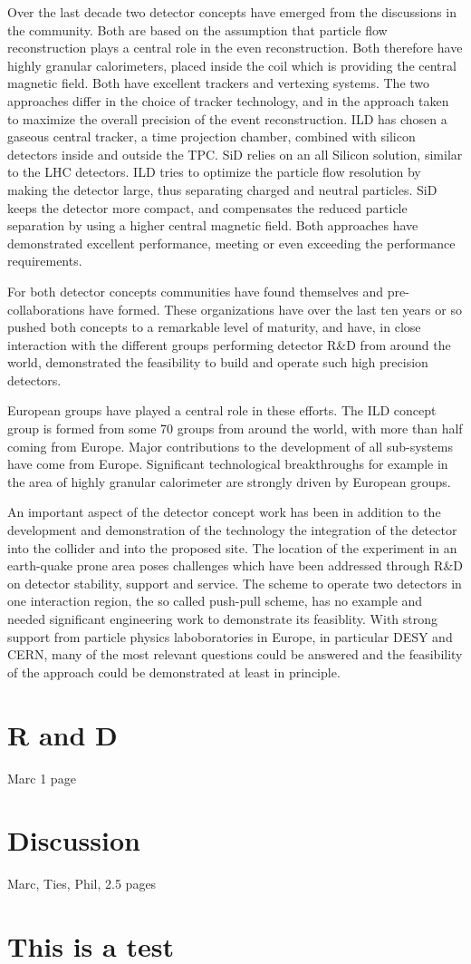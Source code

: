 \documentclass[%
 reprint,
 amsmath,amssymb,
 aps,
]{revtex4-1}
\begin{document}
Over the last decade two detector concepts have emerged from the discussions in the community. Both are based on the assumption that particle flow reconstruction plays a central role in the even reconstruction. Both therefore have highly granular calorimeters, placed inside the coil which is providing the central magnetic field. Both have excellent trackers and vertexing systems. The two approaches differ in the choice of tracker technology, and in the approach taken to maximize the overall precision of the event reconstruction. ILD has chosen a gaseous central tracker, a time projection chamber, combined with silicon detectors inside and outside the TPC. SiD relies on an all Silicon solution, similar to the LHC detectors. ILD tries to optimize the particle flow resolution by making the detector large, thus separating charged and neutral particles. SiD keeps the detector more compact, and compensates the reduced particle separation by using a higher central magnetic field. Both approaches have demonstrated excellent performance, meeting or even exceeding the performance requirements. 

For both detector concepts communities have found themselves and pre-collaborations have formed. These organizations have over the last ten years or so pushed both concepts to a remarkable level of maturity, and have, in close interaction with the different groups performing detector R\&D from around the world, demonstrated the feasibility to build and operate such high precision detectors. 

European groups have played a central role in these efforts. The ILD concept group is formed from some 70 groups from around the world, with more than half coming from Europe. Major contributions to the development of all sub-systems have come from Europe. Significant technological breakthroughs for example in the area of highly granular calorimeter are strongly driven by European groups. 

An important aspect of the detector concept work has been in addition to the development and demonstration of the technology the integration of the detector into the collider and into the proposed site. The location of the experiment in an earth-quake prone area poses challenges which have been addressed through R\&D on detector stability, support and service. The scheme to operate two detectors in one interaction region, the so called push-pull scheme, has no example and needed significant engineering work to demonstrate its feasiblity. With strong support from particle physics laboboratories in Europe, in  particular DESY and CERN, many of the most relevant questions could be answered and the feasibility of the approach could be demonstrated at least in principle. 


\section{\label{sec:RandD}R and D}

Marc 1 page

\section{\label{sec:discussion}Discussion}

Marc, Ties, Phil, 2.5 pages


\section{This is a test}
\end{document}
